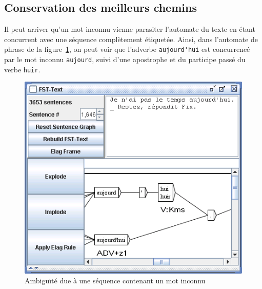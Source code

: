 \subsection{Conservation des meilleurs chemins}
\label{section-keeping-best-paths}
Il peut arriver qu’un mot inconnu vienne parasiter l’automate du texte en étant concurrent avec une
séquence complètement étiquetée. Ainsi, dans l’automate de phrase de la
figure~\ref{fig-unknown-word-ambiguity}, on peut voir que l’adverbe \verb+aujourd'hui+ est
concurrencé par le mot inconnu \verb+aujourd+, suivi d’une apostrophe et du participe passé du verbe
\verb+huir+.


\begin{figure}[!ht]
\begin{center}
\includegraphics[width=11.6cm]{resources/img/fig7-8.png}
\caption{Ambiguïté due à une séquence contenant un mot inconnu\label{fig-unknown-word-ambiguity}}
\end{center}
\end{figure}

